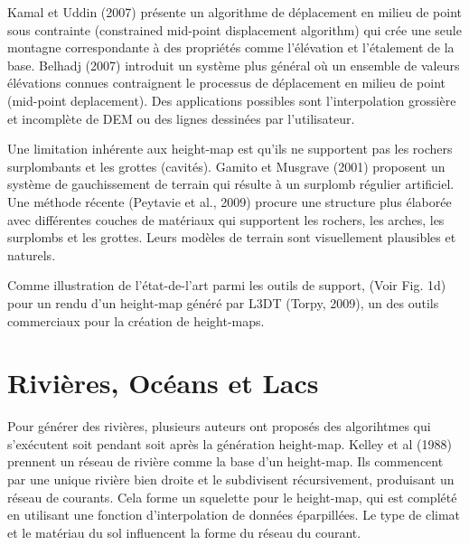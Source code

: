 \documentclass[11pt]{report}
\begin{document}
Kamal et Uddin (2007) présente un algorithme de déplacement en milieu de point sous contrainte (constrained mid-point displacement algorithm) qui crée une seule montagne correspondante à des propriétés comme l'élévation et l'étalement de la base. Belhadj (2007) introduit un système plus général où un ensemble de valeurs élévations connues contraignent le processus de déplacement en milieu de point (mid-point deplacement). Des applications possibles sont l'interpolation grossière et incomplète de DEM ou des lignes dessinées par l'utilisateur. \newline

Une limitation inhérente aux height-map est qu'ils ne supportent pas les rochers surplombants et les grottes (cavités). Gamito et Musgrave (2001) proposent un système de gauchissement de terrain qui résulte à un surplomb régulier artificiel. Une méthode récente (Peytavie et al., 2009) procure une structure plus élaborée avec différentes couches de matériaux qui supportent les rochers, les arches, les surplombs et les grottes. Leurs modèles de terrain sont visuellement plausibles et naturels.\newline

Comme illustration de l'état-de-l'art parmi les outils de support, (Voir Fig. 1d) pour un rendu d'un height-map généré par L3DT (Torpy, 2009), un des outils commerciaux pour la création de height-maps.

\section{Rivières, Océans et Lacs}

Pour générer des rivières, plusieurs auteurs ont proposés des algorihtmes qui s'exécutent soit pendant soit après la génération height-map. Kelley et al (1988) \cite{kelley-88} prennent un réseau de rivière comme la base d'un height-map. Ils commencent par une unique rivière bien droite et le subdivisent récursivement, produisant un réseau de courants. Cela forme un squelette pour le height-map, qui est complété en utilisant une fonction d'interpolation de données éparpillées. Le type de climat et le matériau du sol influencent la forme du réseau du courant. \newline
\end{document}
